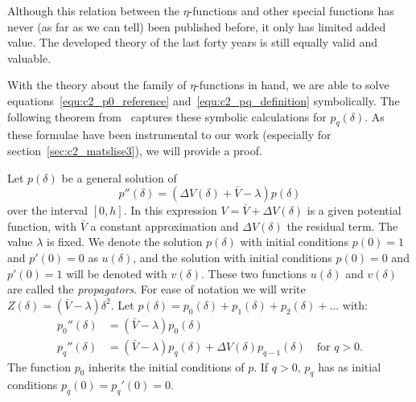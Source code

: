 Although this relation between the $\eta$-functions and other special functions has never (as far as we can tell) been published before, it only has limited added value. The developed theory of the last forty years is still equally valid and valuable.

With the theory about the family of $\eta$-functions in hand, we are able to solve equations~\eqref{equ:c2_p0_reference} and~\eqref{equ:c2_pq_definition} symbolically. The following theorem from~\cite{ixaru_numerical_1984} captures these symbolic calculations for $p_q(\delta)$. As these formulae have been instrumental to our work (especially for section~\ref{sec:c2_matslise3}), we will provide a proof.

\begin{theorem}[Ixaru 1984]\label{the:c2_perturbation_terms}
    Let $p(\delta)$ be a general solution of
    $$
        p''(\delta) = \left(\Delta V(\delta) + \bar{V} - \lambda\right)p(\delta)
    $$
    over the interval $[0, h]$. In this expression $V = \bar{V} + \Delta V(\delta)$ is a given potential function, with $\bar{V}$ a constant approximation and $\Delta V(\delta)$ the residual term. The value $\lambda$ is fixed. We denote the solution $p(\delta)$ with initial conditions $p(0) = 1$ and $p'(0)=0$ as $u(\delta)$, and the solution with initial conditions $p(0) = 0$ and $p'(0) = 1$ will be denoted with $v(\delta)$. These two functions $u(\delta)$ and $v(\delta)$ are called the \emph{propagators}. For ease of notation we will write $Z(\delta) = \left(\bar{V} - \lambda\right)\delta^2$. Let $p(\delta) = p_0(\delta) + p_1(\delta) + p_2(\delta) + \dots$ with:
    \begin{align*}
        p_0''(\delta) & = (\bar{V} - \lambda) p_0(\delta)                                                             \\
        p_q''(\delta) & = (\bar{V} - \lambda) p_q(\delta) + \Delta V(\delta) p_{q-1}(\delta) \quad\text{for $q > 0$.}
    \end{align*}
    The function $p_0$ inherits the initial conditions of $p$. If $q > 0$, $p_q$ has as initial conditions $p_q(0) = p_q'(0) = 0$.


\end{theorem}
